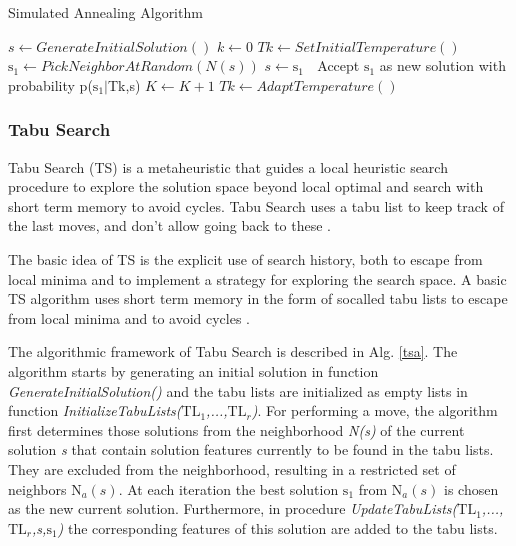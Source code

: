 \begin{algorithm}[h]
  \caption{Simulated Annealing Algorithm}\label{sa}
  \begin{algorithmic}[1]
    
    \State $s\gets GenerateInitialSolution()$
    \State $k\gets 0 $
    \State $Tk\gets SetInitialTemperature()$
    \State $\mbox{s}_1\gets PickNeighborAtRandom(N (s))$
    \State $s\gets\mbox{s}_1$
    \Else $\;$ Accept $\mbox{s}_1$ as new solution with probability p($\mbox{s}_1|$Tk,s) 
    \EndIf
    \State $K\gets K+1$
    \State $Tk\gets AdaptTemperature()$
    \EndWhile
      
  \end{algorithmic}
\end{algorithm}

\subsubsection{Tabu Search}

Tabu Search (TS) is a metaheuristic that guides a local heuristic search procedure to explore the solution space beyond local optimal and search with short term memory to avoid cycles. Tabu Search uses a  tabu list to keep track of the last  moves, and don’t allow going back to these \cite{Glover1986}.

The basic idea of TS is the explicit use of search history, both to escape
from local minima and to implement a strategy for exploring the search space.
A basic TS algorithm uses short term memory in the form of socalled
tabu lists to escape from local minima and to avoid cycles \cite{Tobergte2013}.

The algorithmic framework of Tabu Search is described in Alg. \ref{tsa}.  The algorithm starts by generating an initial solution in function \textit{GenerateInitialSolution()} and the tabu lists are initialized as empty lists in function \textit{InitializeTabuLists($\mbox{TL}_1$,...,$\mbox{TL}_r$)}. For performing a move, the algorithm first determines those solutions from the neighborhood \textit{N(s)} of the current solution \textit{s} that contain solution features currently to be found in the tabu lists. They are excluded from the neighborhood, resulting in a restricted set of neighbors \textit{$\mbox{N}_a(s)$}. At each iteration the best solution \textit{$\mbox{s}_1$} from \textit{$\mbox{N}_a(s)$} is chosen as the new current solution. Furthermore, in procedure \textit{UpdateTabuLists($\mbox{TL}_1$,...,$\mbox{TL}_r$,s,$\mbox{s}_1$)} the corresponding features of this solution are added to the tabu lists.



